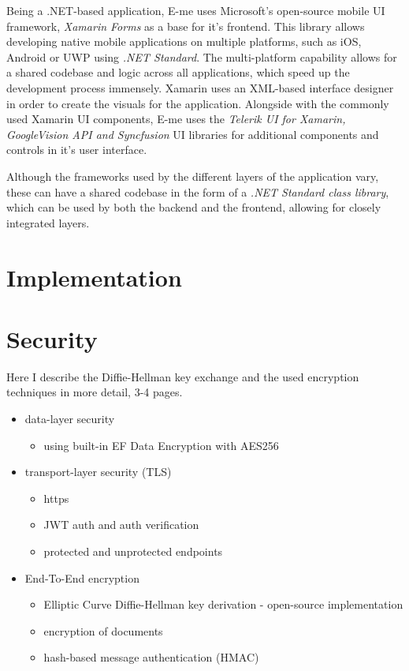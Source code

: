 Being a .NET-based application, E-me uses Microsoft's open-source mobile UI framework, \emph{Xamarin Forms} as a base for it's frontend.
This library allows developing native mobile applications on multiple platforms, such as iOS, Android or UWP using \emph{.NET Standard}. 
The multi-platform capability allows for a shared codebase and logic across all applications, which speed up the development process immensely.
Xamarin uses an XML-based interface designer in order to create the visuals for the application.
Alongside with the commonly used Xamarin UI components, E-me uses the \emph{Telerik UI for Xamarin, GoogleVision API and Syncfusion} UI
libraries for additional components and controls in it's user interface.



Although the frameworks used by the different layers of the application vary, these can have a shared codebase in the form
of a \emph{.NET Standard class library}, which can be used by both the backend and the frontend, allowing for closely integrated layers.

\section{Implementation}



\section{Security}
Here I describe the Diffie-Hellman key exchange and the used encryption techniques in more detail, 3-4 pages.

\begin{itemize}
	\item data-layer security
	\begin{itemize}
		\item using built-in EF Data Encryption with AES256
	\end{itemize}
	\item transport-layer security (TLS)
	\begin{itemize}
		\item https
		\item JWT auth and auth verification
		\item protected and unprotected endpoints
	\end{itemize}
	\item End-To-End encryption
	\begin{itemize}
		\item Elliptic Curve Diffie-Hellman key derivation - open-source implementation
		\item encryption of documents
		\item hash-based message authentication (HMAC)
	\end{itemize}
\end{itemize}